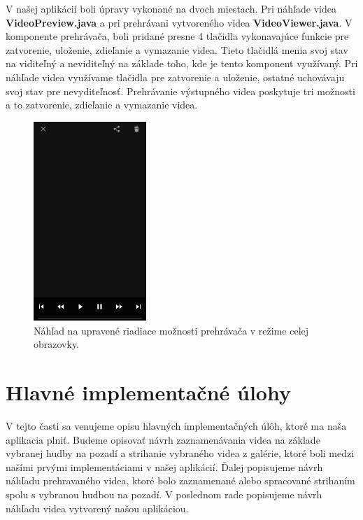 \documentclass[12pt, oneside]{book}
\begin{document}
\hspace{15pt} V našej aplikácií boli úpravy vykonané na dvoch miestach. Pri náhľade videa \textbf{VideoPreview.java} a pri prehrávani vytvoreného videa \textbf{VideoViewer.java}. V komponente prehrávača, boli pridané presne 4 tlačidla vykonavajúce funkcie pre zatvorenie, uloženie, zdieľanie a vymazanie videa. Tieto tlačidlá menia svoj stav na viditeľný a neviditeľný na základe toho, kde je tento komponent využívaný. Pri náhľade videa využívame tlačidla pre zatvorenie a uloženie, ostatné uchovávaju svoj stav pre nevyditeľnosť. Prehrávanie výstupného videa poskytuje tri možnosti a to zatvorenie, zdieľanie a vymazanie videa. 

\begin{figure}[H]
    \centering
    \includegraphics[width=0.38\textwidth]{images/exo.png}
    \caption{Náhľad na upravené riadiace možnosti prehrávača v režime celej obrazovky. }
    \label{fig:obr09}
\end{figure}


\section{Hlavné implementačné úlohy}

\hspace{15pt} V tejto časti sa venujeme opisu hlavných implementačných úlôh, ktoré ma naša aplikacia plniť. Budeme opisovať návrh zaznamenávania videa na základe vybranej hudby na pozadí a strihanie vybraného videa z galérie, ktoré boli medzi našími prvými implementáciami v našej aplikácií. Ďalej popisujeme návrh náhľadu prehravaného videa, ktoré bolo zaznamenané alebo spracované strihaním spolu s vybranou hudbou na pozadí. V poslednom rade popisujeme návrh náhľadu videa vytvorený našou aplikáciou.
\end{document}
